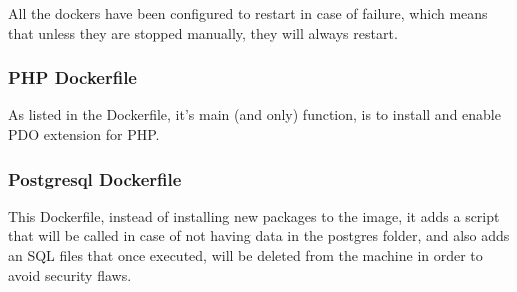     \begin{flushleft}
        All the dockers have been configured to restart in case of failure, which means that unless they are stopped manually,
        they will always restart.
    \end{flushleft}


    \newpage
    \subsubsection[PHP Dockerfile]{PHP Dockerfile}
    
    \begin{flushleft}
        As listed in the Dockerfile, it's main (and only) function, is to install and enable PDO extension for PHP\@.
    \end{flushleft}

    \newpage
    \subsubsection[Postgresql Dockerfile]{Postgresql Dockerfile}
    
    \begin{flushleft}
        This Dockerfile, instead of installing new packages to the image, it adds a script that will be called in case
        of not having data in the postgres folder, and also adds an SQL files that once executed, will be deleted
        from the machine in order to avoid security flaws.
    \end{flushleft}

    \newpage
    \newpage
